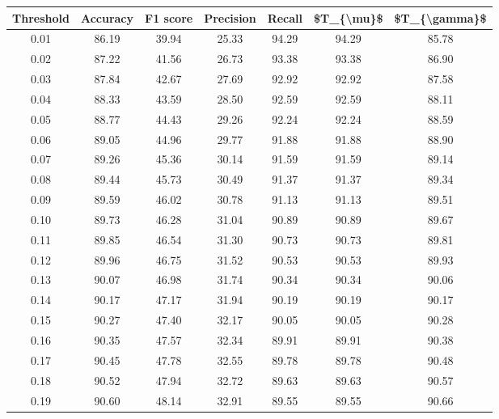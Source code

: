 \begin{tabular}{|c|c|c|c|c|c|c|}
\hline
 Threshold &  Accuracy &  F1 score &  Precision &  Recall &  \$T\_\{\textbackslash mu\}\$ &  \$T\_\{\textbackslash gamma\}\$ \\
\hline
      0.01 &     86.19 &     39.94 &      25.33 &   94.29 &      94.29 &         85.78 \\
      0.02 &     87.22 &     41.56 &      26.73 &   93.38 &      93.38 &         86.90 \\
      0.03 &     87.84 &     42.67 &      27.69 &   92.92 &      92.92 &         87.58 \\
      0.04 &     88.33 &     43.59 &      28.50 &   92.59 &      92.59 &         88.11 \\
      0.05 &     88.77 &     44.43 &      29.26 &   92.24 &      92.24 &         88.59 \\
      0.06 &     89.05 &     44.96 &      29.77 &   91.88 &      91.88 &         88.90 \\
      0.07 &     89.26 &     45.36 &      30.14 &   91.59 &      91.59 &         89.14 \\
      0.08 &     89.44 &     45.73 &      30.49 &   91.37 &      91.37 &         89.34 \\
      0.09 &     89.59 &     46.02 &      30.78 &   91.13 &      91.13 &         89.51 \\
      0.10 &     89.73 &     46.28 &      31.04 &   90.89 &      90.89 &         89.67 \\
      0.11 &     89.85 &     46.54 &      31.30 &   90.73 &      90.73 &         89.81 \\
      0.12 &     89.96 &     46.75 &      31.52 &   90.53 &      90.53 &         89.93 \\
      0.13 &     90.07 &     46.98 &      31.74 &   90.34 &      90.34 &         90.06 \\
      0.14 &     90.17 &     47.17 &      31.94 &   90.19 &      90.19 &         90.17 \\
      0.15 &     90.27 &     47.40 &      32.17 &   90.05 &      90.05 &         90.28 \\
      0.16 &     90.35 &     47.57 &      32.34 &   89.91 &      89.91 &         90.38 \\
      0.17 &     90.45 &     47.78 &      32.55 &   89.78 &      89.78 &         90.48 \\
      0.18 &     90.52 &     47.94 &      32.72 &   89.63 &      89.63 &         90.57 \\
      0.19 &     90.60 &     48.14 &      32.91 &   89.55 &      89.55 &         90.66 \\

\end{tabular}
